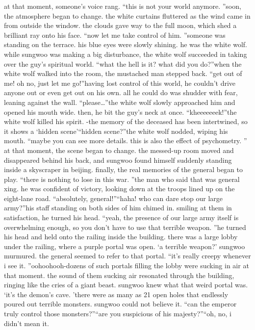 at that moment, someone’s voice rang.
“this is not your world anymore.
”soon, the atmosphere began to change.
the white curtains fluttered as the wind came in from outside the window.
 the clouds gave way to the full moon, which shed a brilliant ray onto his face.
“now let me take control of him.
”someone was standing on the terrace.
 his blue eyes were slowly shining.
 he was the white wolf.
 while sungwoo was making a big disturbance, the white wolf succeeded in taking over the guy’s spiritual world.
“what the hell is it? what did you do?”when the white wolf walked into the room, the mustached man stepped back.
“get out of me! oh no, just let me go!”having lost control of this world, he couldn’t drive anyone out or even get out on his own.
all he could do was shudder with fear, leaning against the wall.
“please…”the white wolf slowly approached him and opened his mouth wide.
then, he bit the guy’s neck at once.
“kheeeeeeek!”the white wolf killed his spirit.
-the memory of the deceased has been intertwined, so it shows a ‘hidden scene’“hidden scene?”the white wolf nodded, wiping his mouth.
“maybe you can see more details.
 this is also the effect of psychometry.
”
at that moment, the scene began to change.
 the messed-up room moved and disappeared behind his back, and sungwoo found himself suddenly standing inside a skyscraper in beijing.
finally, the real memories of the general began to play.
“there is nothing to lose in this war.
”the man who said that was general xing.
 he was confident of victory, looking down at the troops lined up on the eight-lane road.
“absolutely, general!”“haha! who can dare stop our large army?”his staff standing on both sides of him chimed in.
smiling at them in satisfaction, he turned his head.
“yeah, the presence of our large army itself is overwhelming enough, so you don’t have to use that terrible weapon.
”he turned his head and held onto the railing inside the building.
 there was a large lobby under the railing, where a purple portal was open.
‘a terrible weapon?’ sungwoo murmured.
the general seemed to refer to that portal.
“it’s really creepy whenever i see it.
”oohoohooh-dozens of such portals filling the lobby were sucking in air at that moment.
the sound of them sucking air resonated through the building, ringing like the cries of a giant beast.
 sungwoo knew what that weird portal was.
‘it’s the demon’s cave.
’there were as many as 21 open holes that endlessly poured out terrible monsters.
sungwoo could not believe it.
“can the emperor truly control those monsters?”“are you suspicious of his majesty?”“oh, no, i didn’t mean it.

